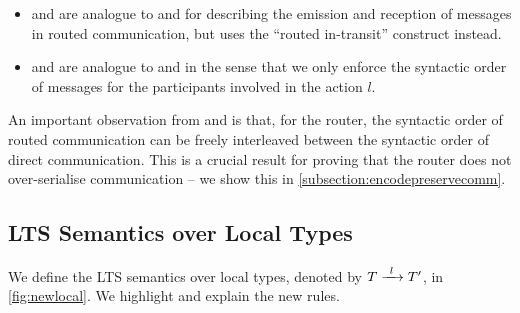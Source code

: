 \begin{figure}[!h]
\begin{prooftree}
\end{prooftree}

\label{fig:newglobal}
\end{figure}

\begin{itemize}

\item {} and 
are analogue to  and 
for describing the emission and reception of
messages in routed communication, but uses
the ``routed in-transit'' construct instead.

\item {} and 
are analogue to  and 
in the sense that we only enforce the
syntactic order of messages for the participants
involved in the action $l$.

\end{itemize}

An important observation from
 and  is that,
for the router,
the syntactic order of routed communication
can be freely interleaved between
the syntactic order of direct communication.
This is a crucial result for proving
that the router does not over-serialise
communication -- 
we show this in \cref{subsection:encodepreservecomm}.

\subsection{LTS Semantics over Local Types}
\label{subsection:newltslocal}

We define the LTS semantics 
over local types,
denoted by $\treduce{T}{T'}{l}$,
in \cref{fig:newlocal}.
We highlight and explain the new rules.

